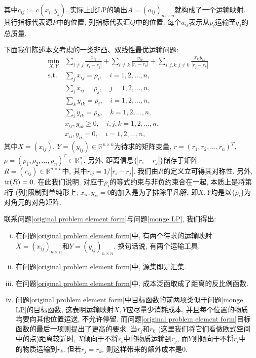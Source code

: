 其中$c_{ij}:=c(x_i,y_j)$. 实际上此LP的输出$A=(a_{ij})_{m\times n}$就构成了一个运输映射. 其行指标代表源$P$中的位置, 列指标代表汇$Q$中的位置. 每个$a_{ij}$表示从$p_i$运输至$q_j$的总质量. 
\par 下面我们陈述本文考虑的一类非凸、双线性最优运输问题:
\begin{equation}
\begin{array}{ll}
\min\limits_{X,Y} & \sum\limits_{i\ne j}\frac{x_{ij}}{|r_i-r_j|}+\sum\limits_{i\ne k}\frac{y_{ik}}{|r_i-r_k|}+\sum\limits_{i,j,k:j\ne k}\frac{x_{ij}y_{ik}}{|r_j-r_k|}\\
\mathrm{s.t.} & \sum\limits_jx_{ij}=\rho_i,\quad i=1,2,\ldots,n,\\
& \sum\limits_ix_{ij}=\rho_j,\quad j=1,2,\ldots,n,\\
& \sum\limits_ky_{ik}=\rho_i,\quad i=1,2,\ldots,n,\\
& \sum\limits_iy_{ik}=\rho_k,\quad k=1,2,\ldots,n,\\
& x_{ij},y_{ik}\ge0,\quad i,j,k=1,2,\ldots,n,\\
& x_{ii},y_{ii}=0,\quad i=1,2,\ldots,n,
\end{array}
\label{original problem element form}
\end{equation}
其中$X=(x_{ij})$, $Y=(y_{ij})\in\mathbb{R}^{n\times n}$为待求的矩阵变量, $r=(r_1,r_2,\ldots,r_n)^T$, $\rho=(\rho_1,\rho_2,\ldots,\rho_n)^T\in\mathbb{R}^n_+$. 另外, 距离信息$\{|r_i-r_j|\}$储存于矩阵$R=(r_{ij})\in\mathbb{R}^{n\times n}$中, 其中$r_{ij}=1/|r_i-r_j|$. 我们由$R$的定义立可得其对称性.
另外, $\mathrm{tr}(R)=0$. 在此我们说明, 对应于$\rho_i$的等式约束与非负约束合在一起, 本质上是将第$i$行 (列)限制到单纯形上; $x_{ii},y_{ii}=0$的加入是为了排除平凡解, 即$X,Y$均是以$\{\rho_i\}$为对角元的对角矩阵.
\par 联系问题\eqref{original problem element form}与问题\eqref{monge LP}, 我们得出:
\begin{enumerate}[(i)]
\item 在问题\eqref{original problem element form}中, 有两个待求的运输映射$X=(x_{ij})_{n\times n}$和$Y=(y_{ij})_{n\times n}$. 换句话说, 有两个运输工具.
\item 在问题\eqref{original problem element form}中, 源集即是汇集.
\item 在问题\eqref{original problem element form}中, 成本泛函取成了距离的反比例函数.
\item 问题\eqref{original problem element form}中目标函数的前两项类似于问题\eqref{monge LP}的目标函数, 这表明运输映射$X,Y$应尽量少消耗成本, 并且每个位置的物质均要向其他位置运送, 不允许停留. 而问题\eqref{original problem element form}目标函数的最后一项则提出了更高的要求. 当$r_j$和$r_k$ (这里我们将它们看做欧式空间中的点)距离较近时, $X$倾向于不将$r_i$中的物质运输到$r_j$, 而$Y$则倾向于不将$r_i$中的物质运输到$r_k$. 但若$r_j=r_k$, 则这样带来的额外成本是0. 
\end{enumerate}
